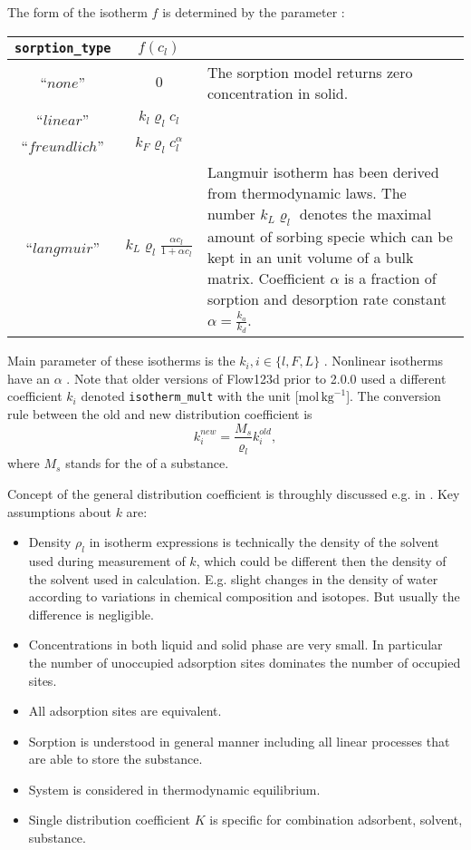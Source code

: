 The form of the isotherm $f$ is determined by the parameter :
\begin{center}
\def\arraystretch{2}
\begin{tabular}{|c|c|p{8cm}|}
\hline
\texttt{sorption\_type} & $f(c_l)$ & \\\hline
``$none$'' & $0$ & The sorption model returns zero concentration in solid.\\\hline
``$linear$'' & $k_l\varrho_l c_l$ &\\\hline
``$freundlich$'' & $k_F \varrho_l c_l^{\alpha}$ &\\\hline
``$langmuir$'' & $k_L \varrho_l \frac{\alpha c_l}{1 + \alpha c_l}$ &
       Langmuir isotherm has been derived from thermodynamic laws. The number $k_L\varrho_l$ denotes the maximal amount 
       of sorbing specie which can be kept in an unit volume of a bulk matrix. Coefficient $\alpha$ is 
       a fraction of sorption and desorption rate constant $\alpha = \frac{k_a}{k_d}$.\\\hline
\end{tabular}
\end{center}
Main parameter of these isotherms is the  $k_i, i\in\{ l,F,L\}$ .
Nonlinear isotherms have an  $\alpha$ \units{}{}{}.
Note that older versions of Flow123d prior to 2.0.0 used a different coefficient $k_i$ denoted \texttt{isotherm\_mult} with the unit [mol$\,\mathrm{kg}^{-1}$].
The conversion rule between the old and new distribution coefficient is
\[ k_i^{new} = \frac{M_s}{\varrho_l} k_i^{old}, \]
where $M_s$ stands for the  of a substance.

Concept of the general distribution coefficient is throughly discussed e.g. in \cite{ORIA1999}. Key assumptions about $k$ are:
\begin{itemize}
 \item Density $\rho_l$ in isotherm expressions is technically the density of the solvent used during measurement of $k$, 
 which could be different then the density of the solvent used in calculation.
 E.g. slight changes in the density of water according to variations in chemical composition and isotopes. But usually the difference is negligible. 
 \item Concentrations in both liquid and solid phase are very small. In particular the number of unoccupied adsorption sites 
 dominates the number of occupied sites. 
 \item All adsorption sites are equivalent.
 \item Sorption is understood in general manner including all linear processes that are able to store the substance.
 \item System is considered in thermodynamic equilibrium.
 \item Single distribution coefficient $K$ is specific for combination adsorbent, solvent, substance.
\end{itemize}


